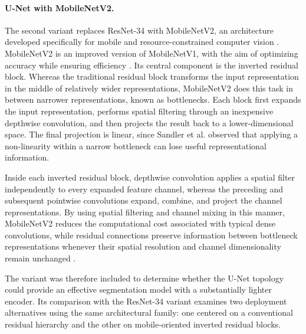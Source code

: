 \paragraph{U-Net with MobileNetV2.}

The second variant replaces ResNet-34 with MobileNetV2, an architecture developed specifically for mobile and resource-constrained computer vision \cite{sandler2018mobilenetv2}. MobileNetV2 is an improved version of MobileNetV1, with the aim of optimizing accuracy while ensuring efficiency \cite{lightweight-survey}. Its central component is the inverted residual block.  Whereas the traditional residual block transforms the input representation in the middle of relatively wider representations, MobileNetV2 does this task in between narrower representations, known as bottlenecks. Each block first expands the input representation, performs spatial filtering through an inexpensive depthwise convolution, and then projects the result back to a lower-dimensional space. The final projection is linear, since Sandler et al. observed that applying a non-linearity within a narrow bottleneck can lose useful representational information.

Inside each inverted residual block, depthwise convolution applies a spatial filter independently to every expanded feature channel, whereas the preceding and subsequent pointwise convolutions expand, combine, and project the channel representations. By using spatial filtering and channel mixing in this manner, MobileNetV2 reduces the computational cost associated with typical dense convolutions, while residual connections preserve information between bottleneck representations whenever their spatial resolution and channel dimensionality remain unchanged \cite{sandler2018mobilenetv2}.

The variant was therefore included to determine whether the U-Net topology could provide an effective segmentation model with a substantially lighter encoder. Its comparison with the ResNet-34 variant examines two deployment alternatives using the same architectural family: one centered on a conventional residual hierarchy and the other on mobile-oriented inverted residual blocks.

